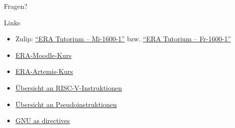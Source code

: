 \begin{frame}[c]{}{}
	\begin{center}
		\LARGE Fragen?
	\end{center}
\end{frame}


\begin{frame}[c, fragile]{Links}{}
	\begin{itemize}
		\item Zulip: \href{https://zulip.cit.tum.de/#narrow/channel/3254-ERA-Tutorium-.E2.80.93-Mi-1600-1}{\enquote{ERA Tutorium -- Mi-1600-1}}
		      bzw. \href{https://zulip.cit.tum.de/#narrow/channel/3266-ERA-Tutorium-.E2.80.93-Fr-1600-1}{\enquote{ERA Tutorium -- Fr-1600-1}}
		\item \href{https://www.moodle.tum.de/course/view.php?id=121343}{ERA-Moodle-Kurs}
		\item \href{https://artemis.tum.de/courses/596/exercises/21744}{ERA-Artemis-Kurs}
		\item \href{https://msyksphinz-self.github.io/riscv-isadoc/html/index.html}{Übersicht an RISC-V-Instruktionen}
		\item \href{https://github.com/riscv-non-isa/riscv-asm-manual/blob/main/src/asm-manual.adoc#a-listing-of-standard-risc-v-pseudoinstructions}{Übersicht an Pseudoinstruktionen}
		\item \href{https://ftp.gnu.org/old-gnu/Manuals/gas/html_chapter/as_7.html}{GNU as directives}
	\end{itemize}
\end{frame}

\maketitle


